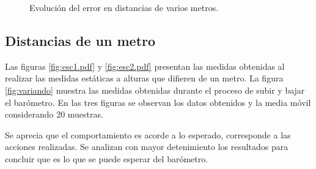 \documentclass[main]{subfiles}
\begin{document}
\begin{figure}[H]
\hspace{-50pt}
  \caption{Evolución del error en distancias de varios metros.}
\label{fig:autocorr}
\end{figure}

\newpage
\subsection{Distancias de un metro}

Las figuras \ref{fig:esc1.pdf} y \ref{fig:esc2.pdf} presentan las medidas obtenidas al realizar las medidas estáticas a alturas que difieren de un metro. La figura \ref{fig:variando} muestra las medidas obtenidas durante el proceso de subir y bajar el barómetro. En las tres figuras se observan los datos obtenidos y la media móvil considerando 20 muestras.

Se aprecia que el comportamiento es acorde a lo esperado, corresponde a las acciones realizadas. Se analizan con mayor detenimiento los resultados para concluir que es lo que se puede esperar del barómetro.
\end{document}

